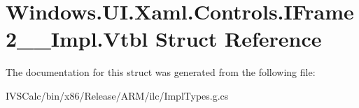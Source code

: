 \hypertarget{struct_windows_1_1_u_i_1_1_xaml_1_1_controls_1_1_i_frame2_____impl_1_1_vtbl}{}\section{Windows.\+U\+I.\+Xaml.\+Controls.\+I\+Frame2\+\_\+\+\_\+\+Impl.\+Vtbl Struct Reference}
\label{struct_windows_1_1_u_i_1_1_xaml_1_1_controls_1_1_i_frame2_____impl_1_1_vtbl}


The documentation for this struct was generated from the following file\+:\begin{DoxyCompactItemize}
\item 
I\+V\+S\+Calc/bin/x86/\+Release/\+A\+R\+M/ilc/Impl\+Types.\+g.\+cs\end{DoxyCompactItemize}
